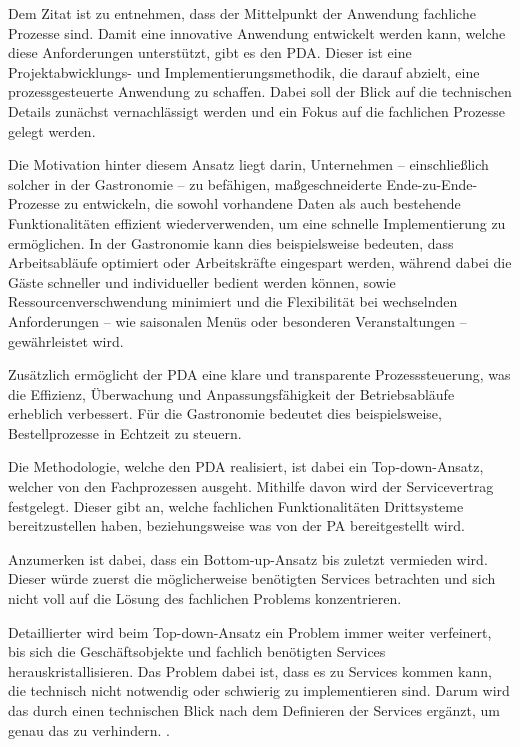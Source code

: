 Dem Zitat ist zu entnehmen, dass der Mittelpunkt der Anwendung fachliche Prozesse sind. Damit eine innovative Anwendung entwickelt werden kann, welche diese Anforderungen unterstützt, gibt es den \ac{PDA}. Dieser ist eine Projektabwicklungs- und Implementierungsmethodik, die darauf abzielt, eine prozessgesteuerte Anwendung zu schaffen. Dabei soll der Blick auf die technischen Details zunächst vernachlässigt werden und ein Fokus auf die fachlichen Prozesse gelegt werden. \citep[vgl.][]{stiehl_prozessgesteuerte_2024}

Die Motivation hinter diesem Ansatz liegt darin, Unternehmen – einschließlich solcher in der Gastronomie – zu befähigen, maßgeschneiderte Ende-zu-Ende-Prozesse zu entwickeln, die sowohl vorhandene Daten als auch bestehende Funktionalitäten effizient wiederverwenden, um eine schnelle Implementierung zu ermöglichen. In der Gastronomie kann dies beispielsweise bedeuten, dass Arbeitsabläufe optimiert oder Arbeitskräfte eingespart werden, während dabei die Gäste schneller und individueller bedient werden können, sowie Ressourcenverschwendung minimiert und die Flexibilität bei wechselnden Anforderungen – wie saisonalen Menüs oder besonderen Veranstaltungen – gewährleistet wird.

Zusätzlich ermöglicht der \ac{PDA} eine klare und transparente Prozesssteuerung, was die Effizienz, Überwachung und Anpassungsfähigkeit der Betriebsabläufe erheblich verbessert. Für die Gastronomie bedeutet dies beispielsweise, Bestellprozesse in Echtzeit zu steuern. \citep[vgl.][]{stiehl_prozessgesteuerte_2024}

Die Methodologie, welche den \ac{PDA} realisiert, ist dabei ein Top-down-Ansatz, welcher von den Fachprozessen ausgeht. Mithilfe davon wird der Servicevertrag festgelegt. Dieser gibt an, welche fachlichen Funktionalitäten Drittsysteme bereitzustellen haben, beziehungsweise was von der \ac{PA} bereitgestellt wird. \citep[vgl.][S. 13]{stiehl_prozessgesteuerte_2013}

Anzumerken ist dabei, dass ein Bottom-up-Ansatz bis zuletzt vermieden wird. Dieser würde zuerst die möglicherweise benötigten Services betrachten und sich nicht voll auf die Lösung des fachlichen Problems konzentrieren. \citep[vgl.][S. 53]{stiehl_prozessgesteuerte_2013}

Detaillierter wird beim Top-down-Ansatz ein Problem immer weiter verfeinert, bis sich die Geschäftsobjekte und fachlich benötigten Services herauskristallisieren. Das Problem dabei ist, dass es zu Services kommen kann, die technisch nicht notwendig oder schwierig zu implementieren sind. Darum wird das durch einen technischen Blick nach dem Definieren der Services ergänzt, um genau das zu verhindern. \citep[vgl.][S. 52ff]{stiehl_prozessgesteuerte_2013}.

